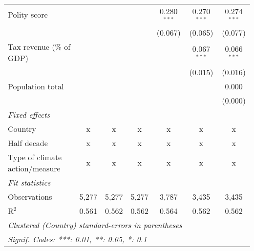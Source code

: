 \begin{tabular}{lcccccc}
   Polity score                                                            &         &                &                & 0.280$^{***}$  & 0.270$^{***}$  & 0.274$^{***}$\\   
                                                                           &         &                &                & (0.067)        & (0.065)        & (0.077)\\   
   Tax revenue (\% of GDP)                                                 &         &                &                &                & 0.067$^{***}$  & 0.066$^{***}$\\   
                                                                           &         &                &                &                & (0.015)        & (0.016)\\   
   Population total                                                        &         &                &                &                &                & 0.000\\   
                                                                           &         &                &                &                &                & (0.000)\\   
   \emph{Fixed effects}\\
   Country                                                                 & x       & x              & x              & x              & x              & x\\  
   Half decade                                                             & x       & x              & x              & x              & x              & x\\  
   Type of climate action/measure                                          & x       & x              & x              & x              & x              & x\\  
   \midrule \emph{Fit statistics}\\
   Observations                                                            & 5,277   & 5,277          & 5,277          & 3,787          & 3,435          & 3,435\\  
   R$^2$                                                                   & 0.561   & 0.562          & 0.562          & 0.564          & 0.562          & 0.562\\  
   \midrule
   \multicolumn{7}{l}{\emph{Clustered (Country) standard-errors in parentheses}}\\
   \multicolumn{7}{l}{\emph{Signif. Codes: ***: 0.01, **: 0.05, *: 0.1}}\\
\end{tabular}
\par\endgroup


